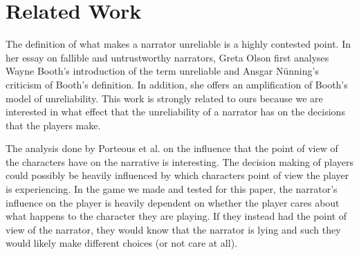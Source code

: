 \section{Related Work}
The definition of what makes a narrator unreliable is a highly contested point. In her essay on fallible and untrustworthy narrators, Greta Olson first analyses Wayne Booth's introduction of the term unreliable and Ansgar N\"unning's criticism of Booth's definition. In addition, she offers an amplification of Booth's model of unreliability\cite{Olson}. This work is strongly related to ours because we are interested in what effect that the unreliability of a narrator has on the decisions that the players make.

The analysis done by Porteous et al.\cite{Porteous} on the influence that the point of view of the characters have on the narrative is interesting. The decision making of players could possibly be heavily influenced by which characters point of view the player is experiencing. In the game we made and tested for this paper, the narrator's influence on the player is heavily dependent on whether the player cares about what happens to the character they are playing. If they instead had the point of view of the narrator, they would know that the narrator is lying and such they would likely make different choices (or not care at all).
